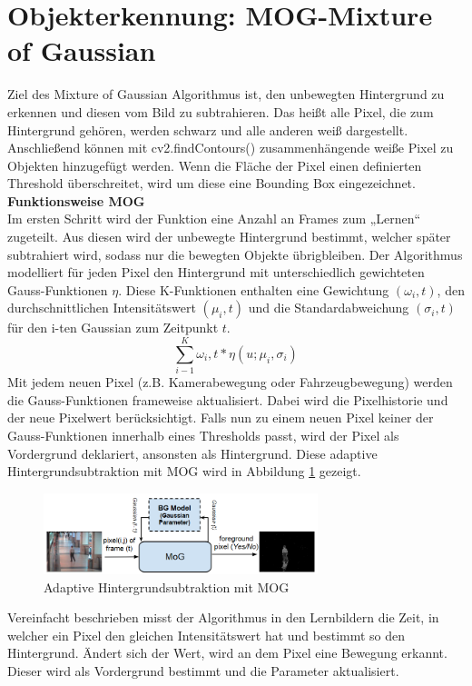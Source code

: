 \documentclass[conference]{IEEEtran}
\begin{document}
	
	\section{Objekterkennung: MOG-Mixture of Gaussian}
	Ziel des Mixture of Gaussian Algorithmus \cite{mog1} ist, den unbewegten Hintergrund zu erkennen und diesen vom Bild zu subtrahieren. Das heißt alle Pixel, die zum Hintergrund gehören, werden schwarz und alle anderen weiß dargestellt. Anschließend können mit cv2.findContours() zusammenhängende weiße Pixel zu Objekten hinzugefügt werden. Wenn die Fläche der Pixel einen definierten Threshold überschreitet, wird um diese eine Bounding Box eingezeichnet.\\
	\textbf{Funktionsweise MOG}\\
	Im ersten Schritt wird der Funktion eine Anzahl an Frames zum „Lernen“ zugeteilt. Aus diesen wird der unbewegte Hintergrund bestimmt, welcher später subtrahiert wird, sodass nur die bewegten Objekte übrigbleiben.
	Der Algorithmus modelliert für jeden Pixel den Hintergrund mit unterschiedlich gewichteten Gauss-Funktionen $\eta$.  Diese K-Funktionen enthalten eine Gewichtung $(\omega_i,t)$, den durchschnittlichen Intensitätswert $(\mu_i,t)$ und die Standardabweichung $(\sigma_i,t)$ für den i-ten Gaussian zum Zeitpunkt $t$.
	\[ \sum_{i-1}^{K} \omega_i,t * \eta(u; \mu_i,\sigma_i)  \]
	Mit jedem neuen Pixel (z.B. Kamerabewegung oder Fahrzeugbewegung) werden die Gauss-Funktionen frameweise aktualisiert. Dabei wird die Pixelhistorie und der neue Pixelwert berücksichtigt. Falls nun zu einem neuen Pixel keiner der Gauss-Funktionen innerhalb eines Thresholds passt, wird der Pixel als Vordergrund deklariert, ansonsten als Hintergrund. Diese adaptive Hintergrundsubtraktion \cite{m2}\cite{m3}\cite{m4} mit MOG wird in Abbildung \ref{mogKonzept} gezeigt.\\
	\begin{figure}[!h]
		\begin{center}
			\includegraphics[width=8cm]{Media/MOGKONZEPt.png}
			\caption{Adaptive Hintergrundsubtraktion mit MOG \cite{mog1}}
			\label{mogKonzept}
		\end{center}
	\end{figure}
	Vereinfacht beschrieben misst der Algorithmus in den Lernbildern die Zeit, in welcher ein Pixel den gleichen Intensitätswert hat und bestimmt so den Hintergrund. Ändert sich der Wert, wird an dem Pixel eine Bewegung erkannt. Dieser wird als Vordergrund bestimmt und die Parameter aktualisiert.\\
	\\
\end{document}
